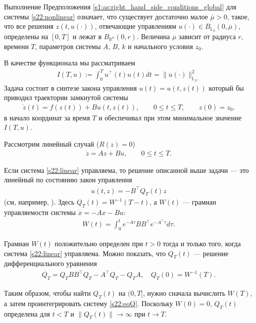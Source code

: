 \documentclass[../main.tex]{subfiles}
\begin{document}
Выполнение Предположения \ref{s1:as:right_hand_side_conditions_global} для системы \eqref{s22:nonlinear} означает, что существует достаточно малое $​\overline{\mu} > 0$, такое, что все решения $z(t,u(\cdot))$, отвечающие управлениям $u(\cdot) \in B_{\mathbb{L}_2}(0, \overline{\mu})$, определены на $[0,T] $ и лежат в  $B_{\mathbb{R}^n}(0,r)$. 
Величина $\overline{\mu}​$ зависит от радиуса $r$, времени $T$, параметров системы $A$, $B$, $k$ и начального условия $z_0$.

В качестве функционала мы рассматриваем 
\begin{gather}\label{s22:cost}
        I(T,u):=\int_0^Tu^\top (t)u(t)dt=     \lVert u(\cdot)\rVert^2_{\mathbb{L}_2.} 
\end{gather}
Задача состоит в синтезе закона управления $u(t)=u(t,z(t))$ который бы приводил траектории замкнутой системы  
\begin{gather*}
    \dot{z}(t)=f(z(t))+B u(t,z(t)),\qquad 0 \leqslant t \leqslant T, \qquad z(0) = z_0.
\end{gather*}
в начало координат за время $T$ и обеспечивал при этом минимальное значение $I(T,u)$. 

Рассмотрим линейный случай ($R(z)=0$)
\begin{gather}\label{s22:linear}
    \dot{z} =  A  z + B u, \qquad 0 \leqslant t \leqslant T.
\end{gather}

Если система \eqref{s22:linear} управляема, то решение описанной выше задачи --- это линейный по состоянию закон управления 
\begin{gather}\label{s22:linear_feedback}
    u(t,z) = -B^{\top} Q_T(t) z
\end{gather}
(см, например, \cite{Abgar,Kur1,GusevOsipov}).
Здесь $Q_T(t)=W^{-1}(T-t)$, а $W(t)$ --- грамиан управляемости системы $\dot{x} = -A x - B u$:
\begin{gather*}
    W(t) = \int_0^t e^{-A\tau}BB^\top e^{-A^{\top}\tau}d\tau. 
\end{gather*}

Грамиан $W(t)$ положительно определен при $t>0$ тогда и только того, когда   
система \eqref{s22:linear} управляема. 
Можно показать, что $Q_T(t)$ --- решение дифференциального уравнения 
\begin{gather}\label{s22:eqQ}
    \dot{Q_T}  = Q_T B B^{\top} Q_T - A^{\top}Q_T - Q_T A, \quad Q_T(0)=W^{-1}(T).
\end{gather}

Таким образом, чтобы найти $Q_T(t)$ на $(0,T]$, нужно сначала вычислить $W(T)$, а затем проинтегрировать систему \eqref{s22:eqQ}.
Поскольку $W(0)=0$, $Q_T(t)$ определена для $t<T$ и $\|Q_T(t)\| \to \infty$ при $t\to T$. 
\end{document}
